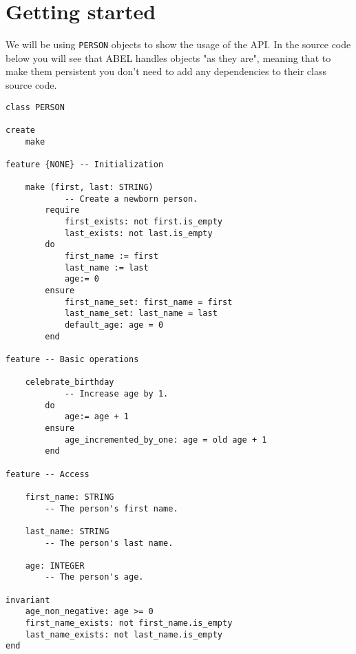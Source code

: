 \documentclass[a4paper,12pt]{report}
\begin{document}
\section{Getting started}
We will be using \lstinline!PERSON! objects to show the usage of the API. 
In the source code below you will see that ABEL handles objects "as they are", meaning that to make them persistent you don't need to add any dependencies to their class source code.

\begin{lstlisting}[language=OOSC2Eiffel, captionpos=b, caption={The PERSON class}, label={lst:person_class}]
class PERSON

create
	make

feature {NONE} -- Initialization

	make (first, last: STRING)
			-- Create a newborn person.
		require
			first_exists: not first.is_empty
			last_exists: not last.is_empty
		do
			first_name := first
			last_name := last
			age:= 0
		ensure
			first_name_set: first_name = first
			last_name_set: last_name = last
			default_age: age = 0
		end

feature -- Basic operations

	celebrate_birthday
			-- Increase age by 1.
		do
			age:= age + 1
		ensure
			age_incremented_by_one: age = old age + 1
		end

feature -- Access

	first_name: STRING
		-- The person's first name.

	last_name: STRING
		-- The person's last name.

	age: INTEGER
		-- The person's age.

invariant
	age_non_negative: age >= 0
	first_name_exists: not first_name.is_empty
	last_name_exists: not last_name.is_empty
end

\end{lstlisting}
\end{document}
